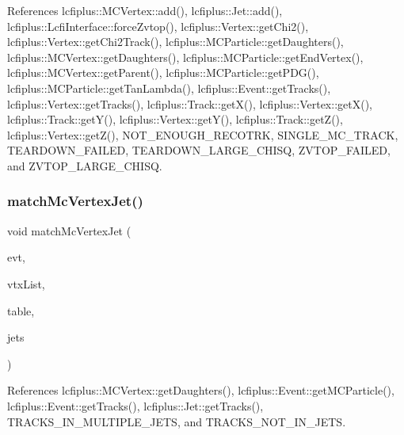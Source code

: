 References lcfiplus\+::\+M\+C\+Vertex\+::add(), lcfiplus\+::\+Jet\+::add(), lcfiplus\+::\+Lcfi\+Interface\+::force\+Zvtop(), lcfiplus\+::\+Vertex\+::get\+Chi2(), lcfiplus\+::\+Vertex\+::get\+Chi2\+Track(), lcfiplus\+::\+M\+C\+Particle\+::get\+Daughters(), lcfiplus\+::\+M\+C\+Vertex\+::get\+Daughters(), lcfiplus\+::\+M\+C\+Particle\+::get\+End\+Vertex(), lcfiplus\+::\+M\+C\+Vertex\+::get\+Parent(), lcfiplus\+::\+M\+C\+Particle\+::get\+P\+D\+G(), lcfiplus\+::\+M\+C\+Particle\+::get\+Tan\+Lambda(), lcfiplus\+::\+Event\+::get\+Tracks(), lcfiplus\+::\+Vertex\+::get\+Tracks(), lcfiplus\+::\+Track\+::get\+X(), lcfiplus\+::\+Vertex\+::get\+X(), lcfiplus\+::\+Track\+::get\+Y(), lcfiplus\+::\+Vertex\+::get\+Y(), lcfiplus\+::\+Track\+::get\+Z(), lcfiplus\+::\+Vertex\+::get\+Z(), N\+O\+T\+\_\+\+E\+N\+O\+U\+G\+H\+\_\+\+R\+E\+C\+O\+T\+RK, S\+I\+N\+G\+L\+E\+\_\+\+M\+C\+\_\+\+T\+R\+A\+CK, T\+E\+A\+R\+D\+O\+W\+N\+\_\+\+F\+A\+I\+L\+ED, T\+E\+A\+R\+D\+O\+W\+N\+\_\+\+L\+A\+R\+G\+E\+\_\+\+C\+H\+I\+SQ, Z\+V\+T\+O\+P\+\_\+\+F\+A\+I\+L\+ED, and Z\+V\+T\+O\+P\+\_\+\+L\+A\+R\+G\+E\+\_\+\+C\+H\+I\+SQ.

\mbox{\label{Driver_8h_acf305dec8cd6439013d0878fd783e647}} 
\subsubsection{match\+Mc\+Vertex\+Jet()}
{\footnotesize\ttfamily void match\+Mc\+Vertex\+Jet (\begin{DoxyParamCaption}\item[{const \textbf{ Event} \&}]{evt,  }\item[{const vector$<$ \textbf{ M\+C\+Vertex} $\ast$$>$ \&}]{vtx\+List,  }\item[{map$<$ \textbf{ M\+C\+Vertex} $\ast$, int $>$ \&}]{table,  }\item[{const vector$<$ const \textbf{ Jet} $\ast$$>$ \&}]{jets }\end{DoxyParamCaption})}



References lcfiplus\+::\+M\+C\+Vertex\+::get\+Daughters(), lcfiplus\+::\+Event\+::get\+M\+C\+Particle(), lcfiplus\+::\+Event\+::get\+Tracks(), lcfiplus\+::\+Jet\+::get\+Tracks(), T\+R\+A\+C\+K\+S\+\_\+\+I\+N\+\_\+\+M\+U\+L\+T\+I\+P\+L\+E\+\_\+\+J\+E\+TS, and T\+R\+A\+C\+K\+S\+\_\+\+N\+O\+T\+\_\+\+I\+N\+\_\+\+J\+E\+TS.

\mbox{\label{Driver_8h_a31c2c9f1b93b23699bc267a89f2ebc72}} 
